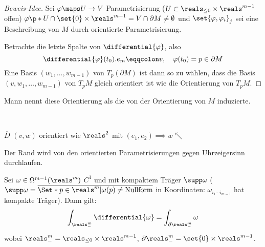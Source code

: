 \begin{proof}[Beweis-Idee]
  Sei \( \varphi\maps U\to V \) Parametrisierung (\( U\subset \reals_{\le 0}\times \reals^{m-1} \) offen) \sd \( \varphi\p*{ U\cap\set{0}\times \reals^{m-1}=V\cap\partial M\neq \emptyset } \)
  und \( \set{\varphi,\varphi_i}_j \) sei eine Beschreibung von \( M \) durch orientierte Parametrisierung.

  Betrachte die letzte Spalte von \( \differential{\varphi} \), also 
  \begin{equation*}
      \differential{\varphi}(t_0).e_m\eqqcolon v,\quad \varphi(t_0)=p\in\partial M
  \end{equation*}
  Eine Basis \( (w_1,\dotsc ,w_{m-1}) \) von \( T_p(\partial M) \) ist dann so zu wählen, dass die Basis \( (v,w_1,\dotsc ,w_{m-1}) \) von \( T_p M \) gleich orientiert ist wie die Orientierung von \( T_p M \).
\end{proof}
\begin{bemerkung*}
  Mann nennt diese Orientierung als die von der Orientierung von \( M \) induzierte.
\end{bemerkung*}
\begin{beispiel}\

  \( \overline{D} \) 
  \( (v,w) \) orientiert wie \( \reals^2 \) mit \( (e_1,e_2)\implies w\nwarrow \)

  \timplies Der Rand wird von den orientierten Parametrisierungen gegen Uhrzeigersinn durchlaufen.
\end{beispiel}


\begin{satz}
  \label{theoStokesSpezialfall} %
  Sei \( \omega\in\Omega^{m-1}(\reals^m) \) $C^1$ und mit kompaktem Träger \( \supp \omega \)
  (\( \supp\omega=\overline{\Set*{p\in\reals^m| \omega(p)\neq \text{Nullform}}} \) in Koordinaten: \( \omega_{i_1\cdots i_{m-1}} \) hat kompakte Träger).
  Dann gilt:
  \begin{equation*}
      \int_{\reals_-^m}\differential{\omega}=\int_{\partial\reals_-^m}\omega
  \end{equation*}
  wobei \( \reals_-^m=\reals_{\le 0}\times \reals^{m-1}\), \( \partial\reals_-^m=\set{0}\times \reals^{m-1} \).
\end{satz}

